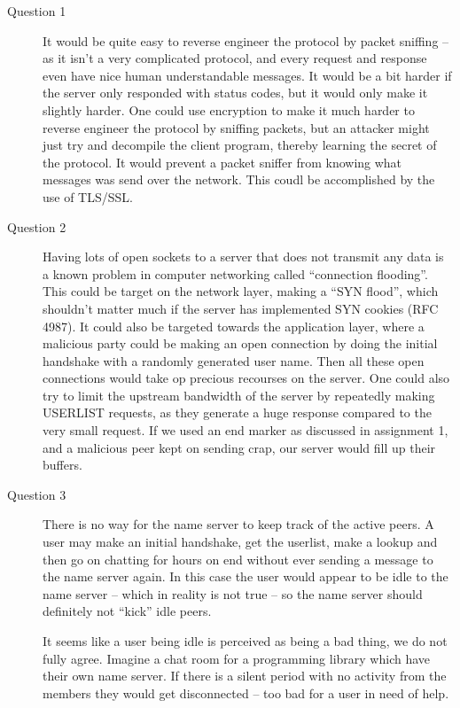 \begin{description} %
    \item[Question 1]
        It would be quite easy to reverse engineer the protocol by packet sniffing -- as it isn't a very complicated protocol, and every request and response even have nice human understandable messages. It would be a bit harder if the server only responded with status codes, but it would only make it slightly harder.
        One could use encryption to make it much harder to reverse engineer the protocol by sniffing packets, but an attacker might just try and decompile the client program, thereby learning the secret of the protocol. It would prevent a packet sniffer from knowing what messages was send over the network. This coudl be accomplished by the use of TLS/SSL.

    \item[Question 2]
        Having lots of open sockets to a server that does not transmit any data is a known problem in computer networking called ``connection flooding''. This could be target on the network layer, making a ``SYN flood'', which shouldn't matter much if the server has implemented SYN cookies (RFC 4987). It could also be targeted towards the application layer, where a malicious party could be making an open connection by doing the initial handshake with a randomly generated user name. Then all these open connections would take op precious recourses on the server. One could also try to limit the upstream bandwidth of the server by repeatedly making USERLIST requests, as they generate a huge response compared to the very small request.
        If we used an end marker as discussed in assignment 1, and a malicious peer kept on sending crap, our server would fill up their buffers.

    \item[Question 3]
        There is no way for the name server to keep track of the active peers. A user may make an initial handshake, get the userlist, make a lookup and then go on chatting for hours on end without ever sending a message to the name server again. In this case the user would appear to be idle to the name server -- which in reality is not true -- so the name server should definitely not ``kick'' idle peers.

        It seems like a user being idle is perceived as being a bad thing, we do not fully agree. Imagine a chat room for a programming library which have their own name server. If there is a silent period with no activity from the members they would get disconnected -- too bad for a user in need of help.


\end{description}
